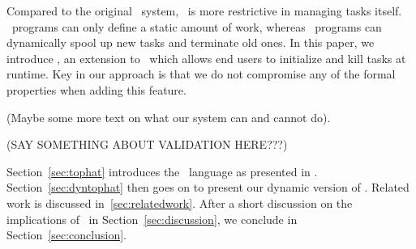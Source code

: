 Compared to the original \ITASKS\ system, \TOPHAT\ is more restrictive in managing tasks itself.
\TOPHAT\ programs can only define a static amount of work, whereas \ITASKS\ programs can dynamically spool up new tasks and terminate old ones.
In this paper, we introduce \DYNTOPHAT, an extension to \TOPHAT\ which allows end users to initialize and kill tasks at runtime.
Key in our approach is that we do not compromise any of the formal properties when adding this feature.

(Maybe some more text on what our system can and cannot do).

(SAY SOMETHING ABOUT VALIDATION HERE???)

Section~\ref{sec:tophat} introduces the \TOPHAT\ language as presented in \citet{Steenvoorden22}.
Section~\ref{sec:dyntophat} then goes on to present our dynamic version of \TOPHAT.
Related work is discussed in~\ref{sec:relatedwork}. After a short discussion on the implications of \DYNTOPHAT\ in Section~\ref{sec:discussion}, we conclude in Section~\ref{sec:conclusion}.
